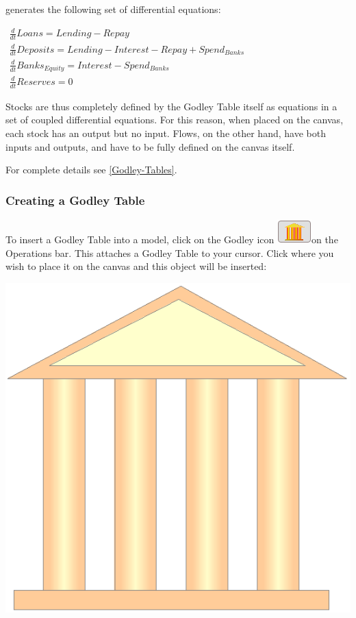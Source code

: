 generates the following set of differential equations:

$\begin{array}{c}
\frac{d}{dt}Loans=Lending-Repay\\
\frac{d}{dt}Deposits=Lending-Interest-Repay+Spend_{Banks}\\
\frac{d}{dt}Banks_{Equity}=Interest-Spend_{Banks}\\
\frac{d}{dt}Reserves=0
\end{array}$

Stocks are thus completely defined by the Godley Table itself as equations
in a set of coupled differential equations. For this reason, when
placed on the canvas, each stock has an output but no input. Flows,
on the other hand, have both inputs and outputs, and have to be fully
defined on the canvas itself.

For complete details see \ref{Godley-Tables}.

\subsubsection{Creating a Godley Table}

To insert a Godley Table into a model, click on the Godley icon \includegraphics{images/GodleyIcon}on
the Operations bar. This attaches a Godley Table to your cursor. Click
where you wish to place it on the canvas and this object will be inserted:

\includegraphics{images/GodleyTableIconMode}

